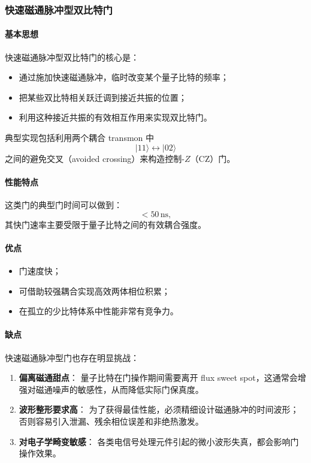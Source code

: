 \documentclass[12pt,a4paper,oneside]{ctexbook}
\begin{document}
\subsubsection{快速磁通脉冲型双比特门}

\paragraph{基本思想}
快速磁通脉冲型双比特门的核心是：
\begin{itemize}
    \item 通过施加快速磁通脉冲，临时改变某个量子比特的频率；
    \item 把某些双比特相关跃迁调到接近共振的位置；
    \item 利用这种接近共振的有效相互作用来实现双比特门。
\end{itemize}

典型实现包括利用两个耦合 transmon 中
\[
|11\rangle \leftrightarrow |02\rangle
\]
之间的避免交叉（avoided crossing）来构造控制-\(Z\)（CZ）门。

\paragraph{性能特点}
这类门的典型门时间可以做到：
\[
<50\,\mathrm{ns},
\]
其快门速率主要受限于量子比特之间的有效耦合强度。

\paragraph{优点}
\begin{itemize}
    \item 门速度快；
    \item 可借助较强耦合实现高效两体相位积累；
    \item 在孤立的少比特体系中性能非常有竞争力。
\end{itemize}

\paragraph{缺点}
快速磁通脉冲型门也存在明显挑战：

\begin{enumerate}
    \item \textbf{偏离磁通甜点}：
    量子比特在门操作期间需要离开 flux sweet spot，这通常会增强对磁通噪声的敏感性，从而降低实际门保真度。

    \item \textbf{波形整形要求高}：
    为了获得最佳性能，必须精细设计磁通脉冲的时间波形；否则容易引入泄漏、残余相位误差和非绝热激发。

    \item \textbf{对电子学畸变敏感}：
    各类电信号处理元件引起的微小波形失真，都会影响门操作效果。
\end{enumerate}
\end{document}

